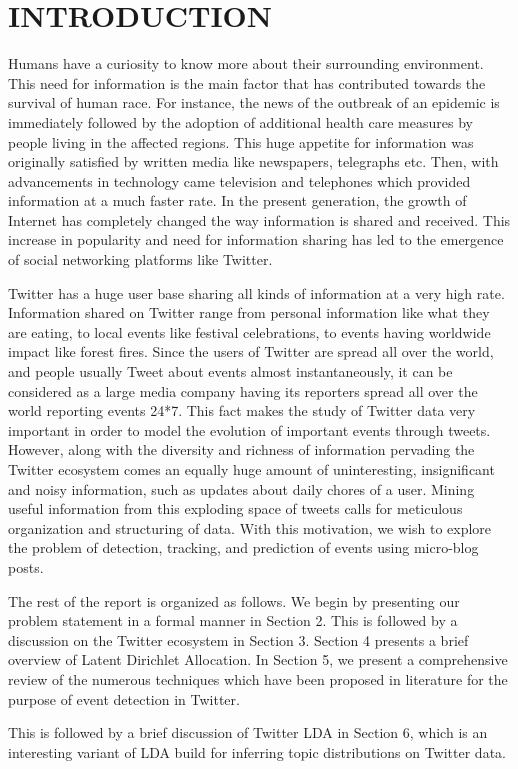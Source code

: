 \section{\uppercase{Introduction}}
Humans have a curiosity to know more about their surrounding environment. This need for information is the main factor that has contributed towards the survival of human race. For instance, the news of the outbreak of an epidemic is immediately followed by the adoption of additional health care measures by people living in the affected regions. This huge appetite for information was originally satisfied by written media like newspapers, telegraphs etc. Then, with advancements in technology came television and telephones which provided information at a much faster rate. In the present generation, the growth of Internet has completely changed the way information is shared and received. This increase in popularity and need for information sharing has led to the emergence of social networking platforms like Twitter.

Twitter has a huge user base sharing all kinds of information at a very high rate. Information shared on Twitter range from personal information like what they are eating, to local events like festival celebrations, to events having worldwide impact like forest fires. Since the users of Twitter are spread all over the world, and people usually Tweet about events almost instantaneously, it can be considered as a large media company having its reporters spread all over the world reporting events 24*7. This fact makes the study of Twitter data very important in order to model the evolution of important events through tweets. However, along with the diversity and richness of information pervading the Twitter ecosystem comes an equally huge amount of uninteresting, insignificant and noisy information, such as updates about daily chores of a user. Mining useful information from this exploding space of tweets calls for meticulous organization and structuring of data. With this motivation, we wish to explore the problem of detection, tracking, and prediction of events using micro-blog posts.

The rest of the report is organized as follows. We begin by presenting our problem statement in a formal manner in Section 2. This is followed by a discussion on the Twitter ecosystem in Section 3. Section 4 presents a brief overview of Latent Dirichlet Allocation. In Section 5, we present a comprehensive review of the numerous techniques which have been proposed in literature for the purpose of event detection in Twitter. 

This is followed by a brief discussion of Twitter LDA in Section 6, which is an interesting variant of LDA build for inferring topic distributions on Twitter data.